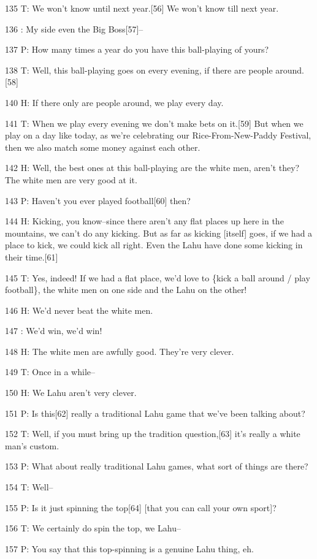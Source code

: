 135 T: We won't know until next year.[56] We won't know till next year.

136    : My side even the Big Boss[57]--

137 P: How many times a year do you have this ball-playing of yours?

138 T: Well, this ball-playing goes on every evening, if there are people around.[58]

140 H: If there only are people around, we play every day.

141 T: When we play every evening we don't make bets on it.[59] But when we play
on a day like today, as we're celebrating our Rice-From-New-Paddy Festival, then
we also match some money against each other.

142 H: Well, the best ones at this ball-playing are the white men, aren't they?
The white men are very good at it.

143 P: Haven't you ever played football[60] then?

144 H: Kicking, you know--since there aren't any flat places up here in the mountains,
we can't do any kicking. But as far as kicking [itself] goes, if we had a place
to kick, we could kick all right. Even the Lahu have done some kicking in their
time.[61]

145 T: Yes, indeed! If we had a flat place, we'd love to \{kick a ball around /
play football\}, the white men on one side and the Lahu on the other!

146 H: We'd never beat the white men.

147    : We'd win, we'd win!

148 H: The white men are awfully good. They're very clever.

149 T: Once in a while--

150 H: We Lahu aren't very clever.

151 P: Is this[62] really a traditional Lahu game that we've been talking about?

152 T: Well, if you must bring up the tradition question,[63] it's really a white
man's custom.

153 P: What about really traditional Lahu games, what sort of things are there?

154 T: Well--

155 P: Is it just spinning the top[64] [that you can call your own sport]?

156 T: We certainly do spin the top, we Lahu--

157 P: You say that this top-spinning is a genuine Lahu thing, eh.

